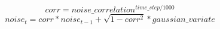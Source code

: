 \documentclass{article}
\begin{document}
$$ corr = noise\_correlation^{time\_step / 1000} $$
$$ noise_{t} = corr * noise_{t-1} + \sqrt{1 - corr^{2}} * gaussian\_variate $$
\end{document}
